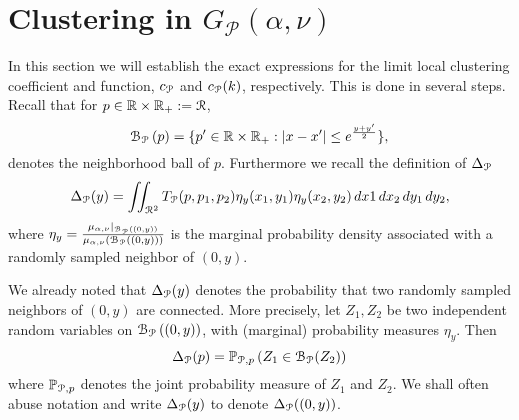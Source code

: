 \section{Clustering in $G_{\mathcal{P}}(\alpha, \nu)$}\label{sec:asymptotics_average_clustering_ast_P}

In this section we will establish the exact expressions for the limit local clustering coefficient and function, $c_{{\mathcal P}}$ and $c_{{\mathcal P}}(k)$, respectively. This is done in several steps. Recall that for $p\in {\ensuremath{\mathbb R}} \times {\ensuremath{\mathbb R}}_+ := {\mathcal R}$,
\[
	{\mathcal B}_{{\mathcal P}}\left(p\right) = \{p^\prime \in {\ensuremath{\mathbb R}} \times {\ensuremath{\mathbb R}}_+ : |x - x^\prime| \le e^{\frac{y + y^\prime}{2}}\},
\]
denotes the neighborhood ball of $p$. Furthermore we recall the definition of $\Delta_{{\mathcal P}}$ 
\[
	\Delta_{{\mathcal P}}(y) = \iint_{{\mathcal R}^2} T_{{\mathcal P}}(p,p_1,p_2) \eta_{y}(x_1,y_1)\eta_{y}(x_2,y_2) \, dx1 \, dx_2 \, dy_1 \, dy_2,
\]
where $\eta_{y} = \frac{\mu_{\alpha,\nu}|_{{\mathcal B}_{{\mathcal P}}\left((0,y)\right)}}{\mu_{\alpha,\nu}\left({\mathcal B}_{{\mathcal P}}\left((0,y)\right)\right)}$ is the marginal probability density associated with a randomly sampled neighbor of $(0,y)$.

We already noted that $\Delta_{{\mathcal P}}(y)$ denotes the probability that two randomly sampled neighbors of $(0,y)$ are connected. More precisely, let $Z_{1}, Z_{2}$ be two independent random variables on ${\mathcal B}_{{\mathcal P}}\left((0,y)\right)$, with (marginal) probability measures $\eta_{y}$. Then
\begin{equation}\label{eq:def_delta_p_alt}
	\Delta_{{\mathcal P}}(p) = \mathbb{P}_{{\mathcal P},p}\left( Z_{1} \in \mathcal{B}_{{\mathcal P}}(Z_{2})\right)
\end{equation}
where $\mathbb{P}_{{\mathcal P},p}$ denotes the joint probability measure of $Z_1$ and $Z_2$. We shall often abuse notation and write $\Delta_{{\mathcal P}}(y)$ to denote $\Delta_{{\mathcal P}}((0,y))$. 


%

